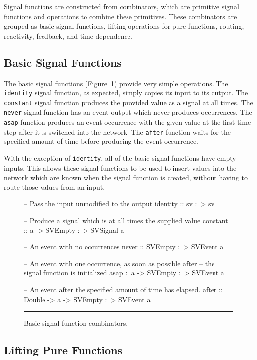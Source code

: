Signal functions are constructed from combinators, which are primitive signal
functions and operations to combine these primitives. These combinators are
grouped as basic signal functions, lifting operations for pure functions,
routing, reactivity, feedback, and time dependence.

\subsection{Basic Signal Functions}
\label{subsection:System_Design_and_Interface-Combinators-Basic_Signal_Functions}

The basic signal functions (Figure~\ref{figure:basic_signal_functions})
provide very simple operations. The {\tt identity} signal function, as expected,
simply copies its input to its output. The {\tt constant} signal function
produces the provided value as a signal at all times. The {\tt never} signal
function has an event output which never produces occurrences. The {\tt asap}
function produces an event occurrence with the given value at the first time
step after it is switched into the network. The {\tt after} function waits for
the specified amount of time before producing the event occurrence.

With the exception of {\tt identity}, all of the basic signal functions have
empty inputs. This allows these signal functions to be used to insert values
into the network which are known when the signal function is created, without
having to route those values from an input.

\begin{figure}
\begin{code}
-- Pass the input unmodified to the output
identity :: sv :~> sv

-- Produce a signal which is at all times the supplied value
constant :: a -> SVEmpty :~> SVSignal a

-- An event with no occurrences
never    :: SVEmpty :~> SVEvent a

-- An event with one occurrence, as soon as possible after
-- the signal function is initialized
asap     :: a -> SVEmpty :~> SVEvent a

-- An event after the specified amount of time has elapsed.
after    :: Double -> a -> SVEmpty :~> SVEvent a
\end{code}
\hrule
\caption{Basic signal function combinators.}
\label{figure:basic_signal_functions}
\end{figure}

\subsection{Lifting Pure Functions}
\label{subsection:System_Design_and_Interface-Combinators-Lifting_Pure_Functions}

